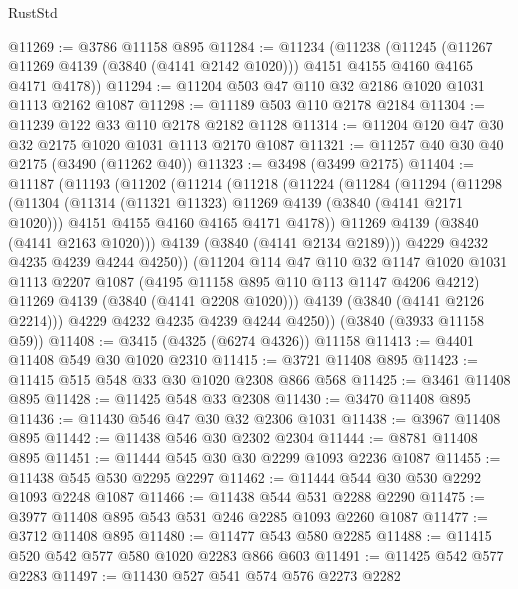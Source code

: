 \begin{lexlean}{RustStd}
\begin{coremodule}
@11269 := @3786 @11158 @895
@11284 := @11234
    (@11238
      (@11245
        (@11267 @11269 @4139 (@3840 (@4141 @2142 @1020)))
        @4151
        @4155
        @4160
        @4165
        @4171
        @4178))
@11294 := @11204 @503 @47 @110 @32 @2186 @1020 @1031 @1113 @2162 @1087
@11298 := @11189 @503 @110 @2178 @2184
@11304 := @11239 @122 @33 @110 @2178 @2182 @1128
@11314 := @11204 @120 @47 @30 @32 @2175 @1020 @1031 @1113 @2170 @1087
@11321 := @11257 @40 @30 @40 @2175 (@3490 (@11262 @40))
@11323 := @3498 (@3499 @2175)
@11404 := @11187
    (@11193
      (@11202
        (@11214
          (@11218
            (@11224
              (@11284
                (@11294
                  (@11298
                    (@11304
                      (@11314 (@11321 @11323) @11269 @4139 (@3840 (@4141 @2171 @1020)))
                      @4151
                      @4155
                      @4160
                      @4165
                      @4171
                      @4178))
                  @11269
                  @4139
                  (@3840 (@4141 @2163 @1020)))
                @4139
                (@3840 (@4141 @2134 @2189)))
              @4229
              @4232
              @4235
              @4239
              @4244
              @4250))
          (@11204
            @114
            @47
            @110
            @32
            @1147
            @1020
            @1031
            @1113
            @2207
            @1087
            (@4195 @11158 @895 @110 @113 @1147 @4206 @4212)
            @11269
            @4139
            (@3840 (@4141 @2208 @1020)))
          @4139
          (@3840 (@4141 @2126 @2214)))
        @4229
        @4232
        @4235
        @4239
        @4244
        @4250))
    (@3840 (@3933 @11158 @59))
@11408 := @3415 (@4325 (@6274 @4326)) @11158
@11413 := @4401 @11408 @549 @30 @1020 @2310
@11415 := @3721 @11408 @895
@11423 := @11415 @515 @548 @33 @30 @1020 @2308 @866 @568
@11425 := @3461 @11408 @895
@11428 := @11425 @548 @33 @2308
@11430 := @3470 @11408 @895
@11436 := @11430 @546 @47 @30 @32 @2306 @1031
@11438 := @3967 @11408 @895
@11442 := @11438 @546 @30 @2302 @2304
@11444 := @8781 @11408 @895
@11451 := @11444 @545 @30 @30 @2299 @1093 @2236 @1087
@11455 := @11438 @545 @530 @2295 @2297
@11462 := @11444 @544 @30 @530 @2292 @1093 @2248 @1087
@11466 := @11438 @544 @531 @2288 @2290
@11475 := @3977 @11408 @895 @543 @531 @246 @2285 @1093 @2260 @1087
@11477 := @3712 @11408 @895
@11480 := @11477 @543 @580 @2285
@11488 := @11415 @520 @542 @577 @580 @1020 @2283 @866 @603
@11491 := @11425 @542 @577 @2283
@11497 := @11430 @527 @541 @574 @576 @2273 @2282

\end{coremodule}
\end{lexlean}
